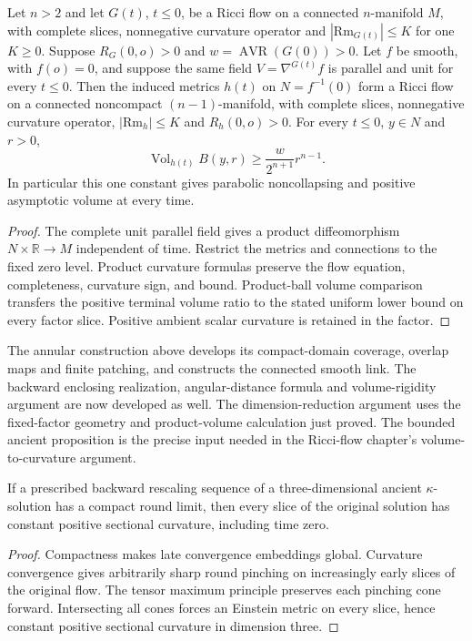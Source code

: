 \begin{lemma}
\label{lem:ancient-fixed-factor}
Let $n>2$ and let $G(t)$, $t\leq0$, be a Ricci flow on a
connected $n$-manifold $M$, with complete slices, nonnegative curvature operator and
$|\mathrm{Rm}_{G(t)}|\leq K$ for one $K\geq0$.
Suppose $R_G(0,o)>0$ and $w=\operatorname{AVR}(G(0))>0$.
Let $f$ be smooth, with $f(o)=0$, and suppose the same field
$V=\nabla^{G(t)}f$ is parallel and unit for every $t\leq0$.
Then the induced metrics $h(t)$ on $N=f^{-1}(0)$ form a
Ricci flow on a connected noncompact $(n-1)$-manifold, with
complete slices, nonnegative curvature operator,
$|\mathrm{Rm}_h|\leq K$ and $R_h(0,o)>0$.
For every $t\leq0$, $y\in N$ and $r>0$,
\[
 \operatorname{Vol}_{h(t)}B(y,r)\geq\frac{w}{2^{n+1}}r^{n-1}.
\]
In particular this one constant gives parabolic noncollapsing
and positive asymptotic volume at every time.
\end{lemma}
\begin{proof}
The complete unit parallel field gives a product diffeomorphism
$N\times\mathbb R\to M$ independent of time. Restrict the metrics and
connections to the fixed zero level. Product curvature formulas preserve the
flow equation, completeness, curvature sign, and bound. Product-ball volume
comparison transfers the positive terminal volume ratio to the stated uniform
lower bound on every factor slice. Positive ambient scalar curvature is
retained in the factor.
\end{proof}

\label{rem:ancient-cone-gap}
The annular construction above develops its compact-domain
coverage, overlap maps and finite patching, and constructs the
connected smooth link.  The backward enclosing realization,
angular-distance formula and volume-rigidity argument are now
developed as well.  The dimension-reduction argument uses the
fixed-factor geometry and product-volume calculation just proved.
The bounded ancient proposition is the precise input needed in the
Ricci-flow chapter's volume-to-curvature argument.


\begin{lemma}
\label{lem:ancient-compact-round-limit}
If a prescribed backward rescaling sequence of a three-dimensional
ancient $\kappa$-solution has a compact round limit, then every
slice of the original solution has constant positive sectional
curvature, including time zero.
\end{lemma}
\begin{proof}
Compactness makes late convergence embeddings global. Curvature convergence
gives arbitrarily sharp round pinching on increasingly early slices of the
original flow. The tensor maximum principle preserves each pinching cone
forward. Intersecting all cones forces an Einstein metric on every slice,
hence constant positive sectional curvature in dimension three.
\end{proof}


